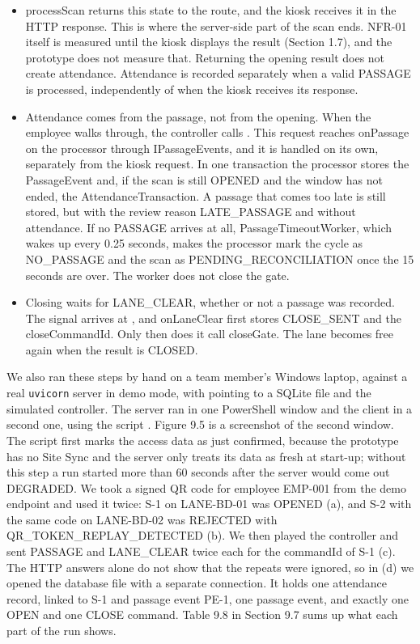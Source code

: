 \begin{itemize}[leftmargin=36pt, labelwidth=22pt, labelsep=8pt, align=left, itemsep=3pt, topsep=4pt, parsep=2pt]
  \item[\textbf{A7}] processScan returns this state to the route, and the kiosk receives it in the HTTP response. This is where the server-side part of the scan ends. NFR-01 itself is measured until the kiosk displays the result (Section 1.7), and the prototype does not measure that. Returning the opening result does not create attendance. Attendance is recorded separately when a valid PASSAGE is processed, independently of when the kiosk receives its response.
  \item[\textbf{A8}] Attendance comes from the passage, not from the opening. When the employee walks through, the controller calls . This request reaches onPassage on the processor through IPassageEvents, and it is handled on its own, separately from the kiosk request. In one transaction the processor stores the PassageEvent and, if the scan is still OPENED and the window has not ended, the AttendanceTransaction. A passage that comes too late is still stored, but with the review reason LATE\_PASSAGE and without attendance. If no PASSAGE arrives at all, PassageTimeoutWorker, which wakes up every 0.25 seconds, makes the processor mark the cycle as NO\_PASSAGE and the scan as PENDING\_RECONCILIATION once the 15 seconds are over. The worker does not close the gate.
  \item[\textbf{A9}] Closing waits for LANE\_CLEAR, whether or not a passage was recorded. The signal arrives at , and onLaneClear first stores CLOSE\_SENT and the closeCommandId. Only then does it call closeGate. The lane becomes free again when the result is CLOSED.
\end{itemize}

We also ran these steps by hand on a team member's Windows laptop, against a real \texttt{uvicorn} server in demo mode, with  pointing to a SQLite file and the simulated controller. The server ran in one PowerShell window and the client in a second one, using the script . Figure 9.5 is a screenshot of the second window. The script first marks the access data as just confirmed, because the prototype has no Site Sync and the server only treats its data as fresh at start-up; without this step a run started more than 60 seconds after the server would come out DEGRADED. We took a signed QR code for employee EMP-001 from the demo endpoint and used it twice: S-1 on LANE-BD-01 was OPENED (a), and S-2 with the same code on LANE-BD-02 was REJECTED with QR\_TOKEN\_REPLAY\_DETECTED (b). We then played the controller and sent PASSAGE and LANE\_CLEAR twice each for the commandId of S-1 (c). The HTTP answers alone do not show that the repeats were ignored, so in (d) we opened the database file with a separate connection. It holds one attendance record, linked to S-1 and passage event PE-1, one passage event, and exactly one OPEN and one CLOSE command. Table 9.8 in Section 9.7 sums up what each part of the run shows.

